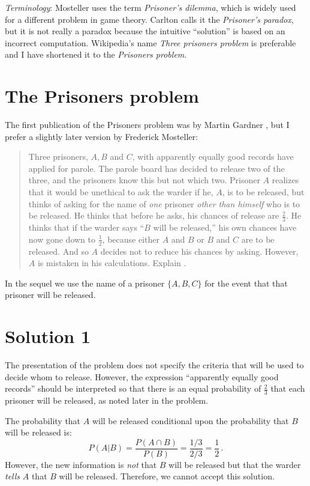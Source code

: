 \documentclass[11pt,a4paper]{article}
\begin{document}
\textit{Terminology}: Mosteller uses the term \emph{Prisoner's dilemma}, which is widely used for a different problem in game theory. Carlton calls it the \emph{Prisoner's paradox}, but it is not really a paradox because the intuitive ``solution'' is based on an incorrect computation. Wikipedia's name \emph{Three prisoners problem} is preferable and I have shortened it to the \emph{Prisoners problem}.

\section{The Prisoners problem}

The first publication of the Prisoners problem was by Martin Gardner \cite{gardner}, but I prefer a slightly later version by Frederick Mosteller:
\begin{quote}
Three prisoners, $A,B$ and $C$, with apparently equally good records have applied for parole. The parole board has decided to release two of the three, and the prisoners know this but not which two. Prisoner $A$ realizes that it would be unethical to ask the warder if he, $A$, is to be released, but thinks of asking for the name of \emph{one} prisoner \emph{other than himself} who is to be released. He thinks that before he asks, his chances of release are $\frac{2}{3}$. He thinks that if the warder says ``$B$ will be released,'' his own chances have now gone down to $\frac{1}{2}$, because either $A$ and $B$ or $B$ and $C$ are to be released. And so $A$ decides not to reduce his chances by asking. However, $A$ is mistaken in his calculations. Explain \cite[Problem~13, emphasis in the original]{fifty}.
\end{quote}
In the sequel we use the name of a prisoner $\{A,B,C\}$ for the event that that prisoner will be released.


\section{Solution 1}

The presentation of the problem does not specify the criteria that will be used to decide whom to release. However, the expression ``apparently equally good records'' should be interpreted so that there is an equal probability of $\frac{2}{3}$ that each prisoner will be released, as noted later in the problem.

The probability that $A$ will be released conditional upon the probability that $B$ will be released is:
\[
P(A|B) = \frac{P(A\cap B)}{P(B)} = \frac{1/3}{2/3}=\frac{1}{2}\,.
\]
However, the new information is \emph{not} that $B$ will be released but that the warder \emph{tells} $A$ that $B$ will be released. Therefore, we cannot accept this solution.
\end{document}
